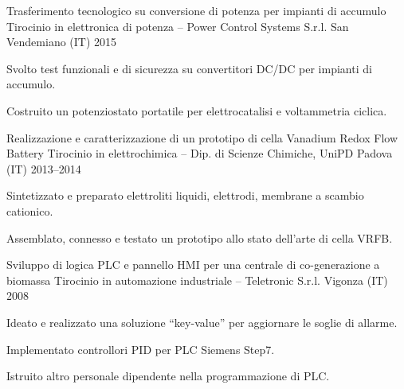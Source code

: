 \begin{cventries}
    \cventry%
        {Trasferimento tecnologico su conversione di potenza per impianti di accumulo}
        {Tirocinio in elettronica di potenza -- Power Control Systems S.r.l.}
        {San Vendemiano (IT)}
        {2015}
        {\begin{cvitems}
            \item Svolto test funzionali e di sicurezza su convertitori DC/DC per impianti di accumulo.
            \item Costruito un potenziostato portatile per elettrocatalisi e voltammetria ciclica.
        \end{cvitems}}

    \cventry%
        {Realizzazione e caratterizzazione di un prototipo di cella Vanadium Redox Flow Battery}
        {Tirocinio in elettrochimica -- Dip. di Scienze Chimiche, UniPD}
        {Padova (IT)}
        {2013--2014}
        {\begin{cvitems}
            \item Sintetizzato e preparato elettroliti liquidi, elettrodi, membrane a scambio cationico.
            \item Assemblato, connesso e testato un prototipo allo stato dell'arte di cella VRFB.
        \end{cvitems}}

    \cventry%
        {Sviluppo di logica PLC e pannello HMI per una centrale di co-generazione a biomassa}
        {Tirocinio in automazione industriale -- Teletronic S.r.l.}
        {Vigonza (IT)}
        {2008}
        {\begin{cvitems}
            \item Ideato e realizzato una soluzione ``key-value'' per aggiornare le soglie di allarme.
            \item Implementato controllori PID per PLC Siemens Step7.
            \item Istruito altro personale dipendente nella programmazione di PLC.
        \end{cvitems}}

\end{cventries}
